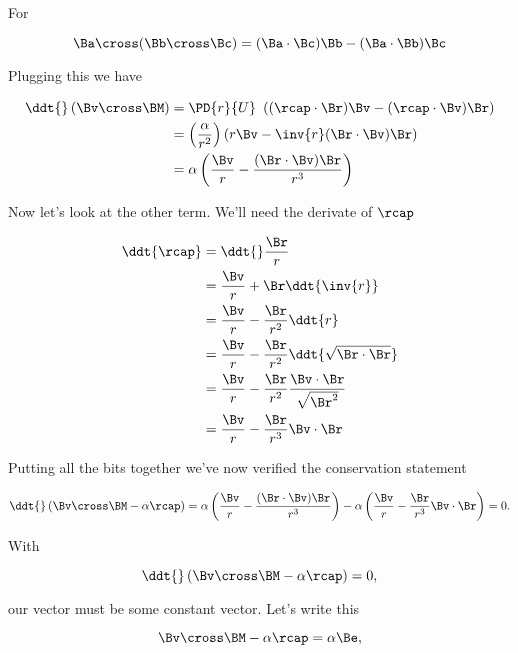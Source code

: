 For

\begin{equation}\label{eqn:RungeLenz:130}
\Ba \cross (\Bb \cross \Bc) = (\Ba \cdot \Bc) \Bb -(\Ba \cdot \Bb) \Bc
\end{equation}

Plugging this we have

\begin{align*}
\ddt{} \left( \Bv \cross \BM \right)
&=
\PD{r}{U} \
\left( 
(\rcap \cdot \Br) \Bv
-(\rcap \cdot \Bv) \Br 
\right) \\
&=
\left( \frac{\alpha}{r^2} \right)
\left( 
r \Bv
-\inv{r}(\Br \cdot \Bv) \Br 
\right) \\
&=
\alpha
\left( 
\frac{\Bv}{r}
-\frac{(\Br \cdot \Bv) \Br }{r^3}
\right) \\
\end{align*}

Now let's look at the other term.  We'll need the derivate of $\rcap$

\begin{align*}
\ddt{\rcap} 
&=
\ddt{} \frac{\Br}{r} \\
&=
\frac{\Bv}{r} + \Br \ddt{\inv{r}} \\
&=
\frac{\Bv}{r} - \frac{\Br}{r^2} \ddt{r} \\
&=
\frac{\Bv}{r} - \frac{\Br}{r^2} \ddt{ \sqrt{\Br \cdot \Br}} \\
&=
\frac{\Bv}{r} - \frac{\Br}{r^2} \frac{\Bv \cdot \Br}{\sqrt{\Br^2}} \\
&=
\frac{\Bv}{r} - \frac{\Br}{r^3} \Bv \cdot \Br
\end{align*}

Putting all the bits together we've now verified the conservation statement

\begin{equation}\label{eqn:RungeLenz:150}
\ddt{} \left(
\Bv \cross \BM - \alpha \rcap
\right)
=
\alpha
\left( 
\frac{\Bv}{r}
-\frac{(\Br \cdot \Bv) \Br }{r^3}
\right) 
-\alpha \left( 
\frac{\Bv}{r} - \frac{\Br}{r^3} \Bv \cdot \Br \right)
= 0.
\end{equation}

With 

\begin{equation}\label{eqn:RungeLenz:170}
\ddt{} \left( \Bv \cross \BM - \alpha \rcap \right) = 0,
\end{equation}

our vector must be some constant vector.  Let's write this

\begin{equation}\label{eqn:RungeLenz:190}
\Bv \cross \BM - \alpha \rcap = \alpha \Be,
\end{equation}

